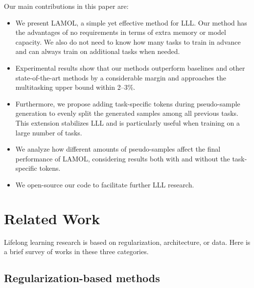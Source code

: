 \documentclass{article} %
\begin{document}
Our main contributions in this paper are:
\begin{itemize}[leftmargin=*]
    \item We present LAMOL, a simple yet effective method for LLL. Our method has the advantages of no requirements in terms of extra memory or model capacity. We also do not need to know how many tasks to train in advance and can always train on additional tasks when needed.
    \item Experimental results show that our methods outperform baselines and other state-of-the-art methods by a considerable margin and approaches the multitasking upper bound within 2--3\%.
    \item Furthermore, we propose adding task-specific tokens during pseudo-sample generation to evenly split the generated samples among all previous tasks. This extension stabilizes LLL and is particularly useful when training on a large number of tasks.
    \item We analyze how different amounts of pseudo-samples affect the final performance of LAMOL, considering results both with and without the task-specific tokens.
    \item We open-source our code to facilitate further LLL research.
\end{itemize}


\section{Related Work}
Lifelong learning research is based on regularization, architecture, or data.
Here is a brief survey of works in these three categories.

\subsection{Regularization-based methods}
\end{document}
